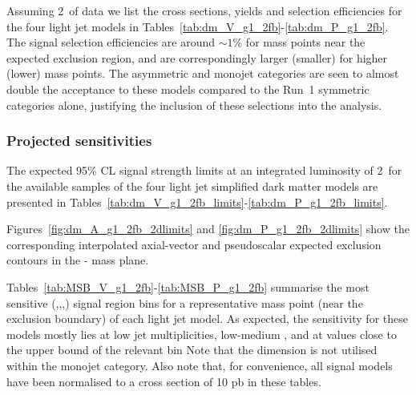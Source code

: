 Assuming 2~\ifb of data we list the cross sections, yields and selection 
efficiencies for the four light jet models in
Tables~\ref{tab:dm_V_g1_2fb}-\ref{tab:dm_P_g1_2fb}. The signal selection
efficiencies are around $\sim 1$\% for mass points near the expected exclusion
region, and are correspondingly larger (smaller) for higher (lower) mass points.
The asymmetric and monojet categories are seen to almost double the acceptance
to these models compared to the Run~1 symmetric categories alone, justifying the
inclusion of these selections into the analysis.

\clearpage 
 \clearpage
 \clearpage
 \clearpage
 \clearpage


\subsubsection{Projected sensitivities}

The expected 95\% CL signal strength limits at an integrated luminosity of 2~\ifb for
the available samples of the four light jet simplified dark matter models are
presented in
Tables~\ref{tab:dm_V_g1_2fb_limits}-\ref{tab:dm_P_g1_2fb_limits}.

Figures~\ref{fig:dm_A_g1_2fb_2dlimits} and \ref{fig:dm_P_g1_2fb_2dlimits} show
the corresponding interpolated axial-vector and pseudoscalar expected exclusion 
contours in the {\mphi-\mchi} mass plane.

Tables~\ref{tab:MSB_V_g1_2fb}-\ref{tab:MSB_P_g1_2fb} summarise the most sensitive
{(\njet,\nb,\scalht,\mht)} signal region 
bins for a representative mass point (near the exclusion boundary) of each light
jet model. As expected, the sensitivity for these models mostly lies at low jet
multiplicities, low-medium \scalht, and at \mht values close to the upper bound
of the relevant \scalht bin Note that the \mht dimension is not utilised within 
the monojet category. Also note that, for convenience, all signal models have 
been normalised to a cross section of 10 pb in these tables.

\clearpage

 
\clearpage



\clearpage

